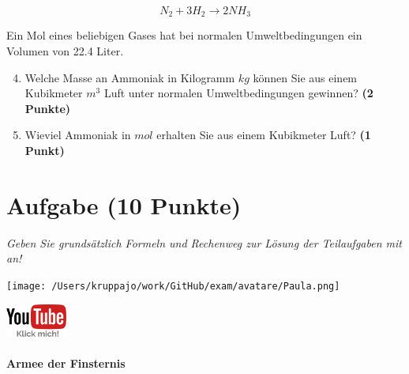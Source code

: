 \documentclass[a4paper, 9pt]{scrartcl}\usepackage[]{graphicx}\usepackage[]{xcolor}
\begin{document}
\begin{equation*}
  N_2 + 3H_2 \rightarrow 2NH_3
\end{equation*}  

Ein Mol eines beliebigen Gases hat bei normalen Umweltbedingungen ein Volumen von 22.4 Liter. %

\begin{enumerate}
  \setcounter{enumi}{3}
\item Welche Masse an Ammoniak in Kilogramm $kg$ können Sie aus einem Kubikmeter $m^3$ Luft unter normalen Umweltbedingungen gewinnen?
  \textbf{(2 Punkte)}
\item Wieviel Ammoniak in $mol$ erhalten Sie aus einem Kubikmeter Luft? \textbf{(1 Punkt)}
\end{enumerate}

 
\clearpage

\section{Aufgabe \hfill (10 Punkte)}

\textit{Geben Sie grundsätzlich Formeln und Rechenweg zur Lösung der Teilaufgaben mit an!} \\[1Ex]
 

 
\begin{minipage}[t]{0.5\textwidth}
\texttt{[image: /Users/kruppajo/work/GitHub/exam/avatare/Paula.png]}
\end{minipage}
\begin{minipage}[t]{0.5\textwidth}
\hfill
\href{https://youtu.be/Bbu6n8MXxQk}{\includegraphics[width = 2cm]{img/youtube}}
\end{minipage}




\paragraph{Armee der Finsternis}
\end{document}
